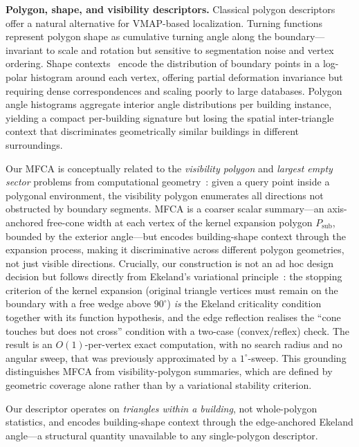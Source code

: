 \documentclass[10pt]{article}
\theoremstyle{plain}
\theoremstyle{definition}
\begin{document}
\noindent\textbf{Polygon, shape, and visibility descriptors.}
Classical polygon descriptors offer a natural alternative for VMAP-based
localization.
Turning functions~\cite{arkin1991efsd} represent polygon shape as cumulative
turning angle along the boundary---invariant to scale and rotation but
sensitive to segmentation noise and vertex ordering.
Shape contexts~\cite{belongie2002shape} encode the distribution of boundary
points in a log-polar histogram around each vertex, offering partial
deformation invariance but requiring dense correspondences and scaling poorly
to large databases.
Polygon angle histograms aggregate interior angle distributions per building
instance, yielding a compact per-building signature but losing the spatial
inter-triangle context that discriminates geometrically similar buildings in
different surroundings.

Our MFCA is conceptually related to the \emph{visibility polygon}
and \emph{largest empty sector} problems from computational
geometry~\cite{devadoss2011discrete,orourke1987computational}: given a
query point inside a polygonal environment, the visibility polygon enumerates
all directions not obstructed by boundary segments.
MFCA is a coarser scalar summary---an axis-anchored free-cone width at each
vertex of the kernel expansion polygon $P_{\mathrm{sub}}$, bounded by the
exterior angle---but encodes building-shape context through the expansion
process, making it discriminative across different polygon geometries, not just
visible directions.
Crucially, our construction is not an ad hoc design decision but follows
directly from Ekeland's variational principle~\cite{ekeland1974}:
the stopping criterion of the kernel expansion (original triangle vertices
must remain on the boundary with a free wedge above $90^\circ$) \emph{is} the
Ekeland criticality condition together with its function hypothesis,
and the edge reflection realises the ``cone touches but does not cross''
condition with a two-case (convex/reflex) check.
The result is an $O(1)$-per-vertex exact computation, with no search radius
and no angular sweep, that was previously approximated by a
$1^\circ$-sweep.
This grounding distinguishes MFCA from visibility-polygon summaries, which
are defined by geometric coverage alone rather than by a variational
stability criterion.

Our descriptor operates on \emph{triangles within a building}, not
whole-polygon statistics, and encodes building-shape context through the
edge-anchored Ekeland angle---a structural quantity unavailable to any
single-polygon descriptor.
\end{document}
